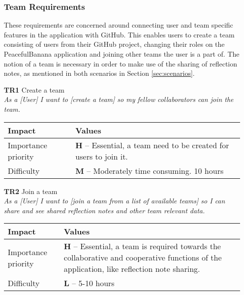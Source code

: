 \begin{itemize}
\subsubsection{Team Requirements}
These requirements are concerned around connecting user and team specific features in the application with GitHub. This enables users to create a team consisting of users from their GitHub project, changing their roles on the PeacefulBanana application and joining other teams the user is a part of. The notion of a team is necessary in order to make use of the sharing of reflection notes, as mentioned in both scenarios in Section \ref{sec:scenarios}. 
    \item[\textbf{TR1}] Create a team\\
        \textit{\small{As a [User] I want to [create a team] so my fellow collaborators can join the team.}}

        \begin{tabular}{| l | p{8cm} |}
            \hline
            \rowcolor[gray]{0.8}
            \textbf{Impact} & \textbf{Values} \\
            \hline
            Importance priority & \textbf{H} -- Essential, a team need to be created for users to join it.\\
            Difficulty & \textbf{M} -- Moderately time consuming. 10 hours\\
            \hline
        \end{tabular}
    \vspace{0.5cm}

    \item[\textbf{TR2}] Join a team\\
        \textit{\small{As a [User] I want to [join a team from a list of available teams] so I can share and see shared reflection notes and other team relevant data.}}

        \begin{tabular}{| l | p{8cm} |}
            \hline
            \rowcolor[gray]{0.8}
            \textbf{Impact} & \textbf{Values} \\
            \hline
            Importance priority & \textbf{H} -- Essential, a team is required towards the collaborative and cooperative functions of the application, like reflection note sharing.\\
            Difficulty & \textbf{L} -- 5-10 hours\\
            \hline
        \end{tabular}
    \vspace{0.5cm}


\end{itemize}
